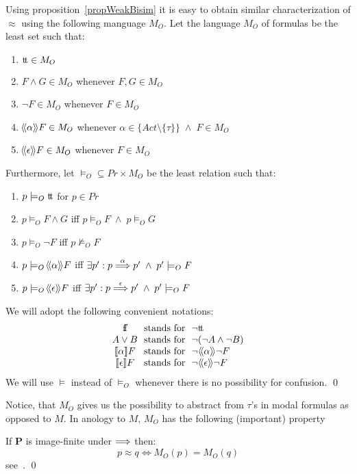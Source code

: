 Using proposition~\ref{propWeakBisim} it is easy to obtain similar characterization of $\approx$ using the following manguage $M_O$. Let the language $M_O$ of formulas be the least set such that:
\begin{enumerate}
\item $\hbox{t}\!\hbox{t}\in M_O$
\item $F\wedge G\in M_O$  whenever $F, G\in M_O$
\item $\neg F\in M_O$ whenever $F\in M_O$
\item $\!\left<\!\left<\alpha\right>\!\right>\!F\in M_O$ whenever $\alpha\in\{Act\setminus\{\tau\}\}\;\wedge\; F\in M_O$
\item $\!\left<\!\left<\epsilon\right>\!\right>\!F\in M_O$ whenever $F\in M_O$
\end{enumerate}

\noindent
Furthermore, let $\models_O\subseteq Pr\times M_O$ be the least relation such that:
\begin{enumerate}
\item $p\models_O \hbox{t}\!\hbox{t}$ for $p\in Pr$
\item $p\models_O F\wedge G$ iff $p\models_O F\;\wedge\; p\models_O G$
\item $p\models_O \neg F$ iff $p\not\models_O F$
\item $p\models_O\!\left<\!\left<\alpha\right>\!\right>\!F$ iff $\exists p': p\stackrel{\alpha}{\Longrightarrow}p'\;\wedge\; p'\models_O F$
\item $p\models_O\!\left<\!\left<\epsilon\right>\!\right>\!F$ iff $\exists p': p\stackrel{\epsilon}{\Longrightarrow}p'\;\wedge\; p'\models_O F$
\end{enumerate}

\begin{notation}\label{notationDerShorthand}
We will adopt the following convenient notations:
\[
\begin{array}{c@{\hbox{\ \ \hbox{stands for}\ \ }}l}
\dff & \neg \dtt\\
A\vee B & \neg (\neg A\wedge\neg B)\\
\obmay{\alpha}F & \neg\obcan{\alpha}\neg F\\
\obmay{\epsilon}F & \neg\obcan{\epsilon}\neg F
\end{array}
\]
We will use $\models$ instead of $\models_O$ whenever there is no possibility for confusion.
\qed
\end{notation}

\noindent
Notice, that $M_O$ gives us the possibility to abstract from $\tau$'s in modal formulas as opposed to $M$. In anology to $M$, $M_O$ has the following (important) property
\begin{theorem}
If {\bf P\/} is image-finite under $\stackrel{}{\Longrightarrow}$ then:
\[
p\approx q \Leftrightarrow M_O(p) = M_O(q)
\]
\proof see~\cite{HennessyMilner}.
\qed
\end{theorem}



